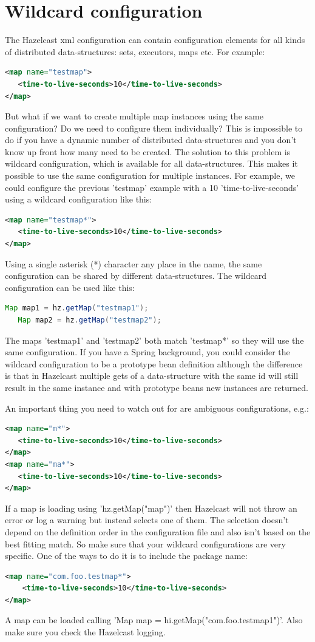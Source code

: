 \section{Wildcard configuration}
The Hazelcast xml configuration can contain configuration elements for all kinds of distributed data-structures: sets, executors, maps etc. For example:
\begin{lstlisting}[language=xml]
<map name="testmap">
   <time-to-live-seconds>10</time-to-live-seconds>
</map>
\end{lstlisting}
But what if we want to create multiple map instances using the same configuration? Do we need to configure them individually? This is impossible to do if you have a dynamic number of distributed data-structures and you don't know up front how many need to be created. The solution to this problem is wildcard configuration, which is available for all data-structures. This makes it possible to use the same configuration for multiple instances. For example, we could configure the previous 'testmap' example with a 10 'time-to-live-seconds' using a wildcard configuration like this:
\begin{lstlisting}[language=xml]
<map name="testmap*">
   <time-to-live-seconds>10</time-to-live-seconds>
</map>
\end{lstlisting}
Using a single asterisk (*) character any place in the name, the same configuration can be shared by different  data-structures. The wildcard configuration can be used like this:
\begin{lstlisting}[language=java]
   Map map1 = hz.getMap("testmap1");
   Map map2 = hz.getMap("testmap2");
\end{lstlisting}
The maps 'testmap1' and 'testmap2' both match 'testmap*' so they will use the same configuration. If you have a Spring background, you could consider the wildcard configuration to be a prototype bean definition although the difference is that in Hazelcast multiple gets of a data-structure with the same id will still result in the same instance and with prototype beans new instances are returned.

An important thing you need to watch out for are ambiguous configurations, e.g.:
\begin{lstlisting}[language=xml]
<map name="m*">
   <time-to-live-seconds>10</time-to-live-seconds>
</map>
<map name="ma*">
   <time-to-live-seconds>10</time-to-live-seconds>
</map>
\end{lstlisting}
If a map is loading using 'hz.getMap("map")' then Hazelcast will not throw an error or log a warning but instead selects one of them. The selection doesn't depend on the definition order in the configuration file and also isn't based on the best fitting match. So make sure that your wildcard configurations are very specific. One of the ways to do it is to include the package name:
\begin{lstlisting}[language=xml]
<map name="com.foo.testmap*">
    <time-to-live-seconds>10</time-to-live-seconds>
</map>
\end{lstlisting}
A map can be loaded calling 'Map map = hi.getMap("com.foo.testmap1")'. Also make sure you check the Hazelcast logging.

